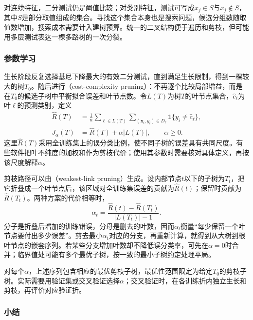 对连续特征，二分测试仍是阈值比较；对类别特征，测试可写成$x_j\in S$与$x_j\notin S$，其中$S$是部分取值组成的集合。寻找这个集合本身也是搜索问题，候选分组数随取值数增加，搜索成本需要计入建树预算。统一的二叉结构便于遍历和剪枝，但可能用多层测试表达一棵多路树的一次分裂。

\subsubsection{参数学习}
\label{sec:classification-cart-learning}

生长阶段反复选择基尼下降最大的有效二分测试，直到满足生长限制，得到一棵较大的树$T_0$。随后进行（cost-complexity pruning）：不再逐个比较局部增益，而是在$T_0$的候选子树中平衡拟合误差和叶节点数。令$L(T)$为树$T$的叶节点集合，$\hat c_\ell$为叶$\ell$的预测类别，定义
\begin{align}
  \widehat R(T)
  &=\frac{1}{n}\sum_{\ell\in L(T)}
    \sum_{(\bm{x}_i,y_i)\in D_\ell}
    \mathbb{1}\{y_i\neq\hat c_\ell\},
  \label{eq:classification-cart-empirical-risk}\\
  J_\alpha(T)&=\widehat R(T)+\alpha|L(T)|,
  \qquad \alpha\geq0.
  \label{eq:classification-cart-cost-complexity}
\end{align}
这里$\widehat R(T)$采用全训练集上的误分类比例，使不同子树的误差具有共同尺度。有些软件把叶不纯度的加权和作为剪枝代价；使用其参数时需要核对具体定义，再按该尺度解释$\alpha$。

剪枝路径可以由（weakest-link pruning）生成。设内部节点$t$以下的子树为$T_t$，把它折叠成一个叶节点后，该区域对全训练集误差的贡献为$\widehat R(t)$；保留时贡献为$\widehat R(T_t)$。两种方案的代价相等时，
\begin{equation}
  \alpha_t=
  \frac{\widehat R(t)-\widehat R(T_t)}
       {|L(T_t)|-1}.
  \label{eq:classification-weakest-link}
\end{equation}
分子是折叠后增加的训练错误，分母是删去的叶数，因而$\alpha_t$衡量“每少保留一个叶节点要付出多少误差”。剪去最小$\alpha_t$对应的分支，再重新计算，就得到从大树到根叶节点的嵌套序列。若某些分支增加叶数却不降低误分类率，可先在$\alpha=0$时合并；临界值处可能有多个最优子树，按一致的最小子树约定处理平局。

对每个$\alpha$，上述序列包含相应的最优剪枝子树，最优性范围限定为给定$T_0$的剪枝子树。实际需要用验证集或交叉验证选择$\alpha$；交叉验证时，在各训练折内独立生长和剪枝，再评价对应验证折。

\subsubsection{小结}
\label{sec:classification-cart-summary}

